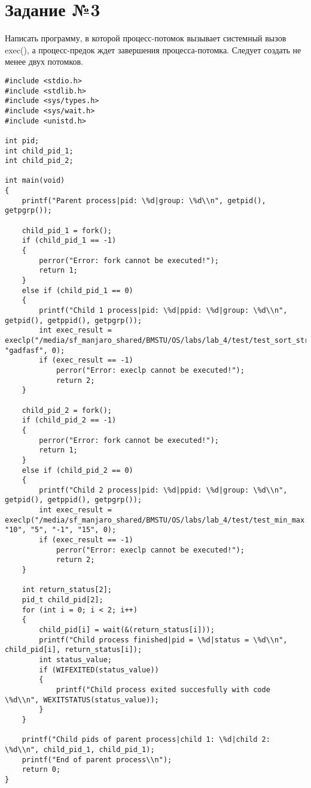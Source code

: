 \section{Задание №3}
Написать программу, в которой процесс-потомок вызывает системный вызов exec(), а процесс-предок ждет завершения процесса-потомка. Следует создать не менее двух потомков.

\begin{lstlisting}[label=task_3,caption=Код к заданию №3]
#include <stdio.h>
#include <stdlib.h>
#include <sys/types.h>
#include <sys/wait.h>
#include <unistd.h>

int pid;
int child_pid_1;
int child_pid_2;

int main(void)
{
    printf("Parent process|pid: \%d|group: \%d\\n", getpid(), getpgrp());

    child_pid_1 = fork();
    if (child_pid_1 == -1)
    {
        perror("Error: fork cannot be executed!");
        return 1;
    }
    else if (child_pid_1 == 0)
    {
        printf("Child 1 process|pid: \%d|ppid: \%d|group: \%d\\n", getpid(), getppid(), getpgrp());
        int exec_result = execlp("/media/sf_manjaro_shared/BMSTU/OS/labs/lab_4/test/test_sort_str.exe", "gadfasf", 0);
        if (exec_result == -1)
            perror("Error: execlp cannot be executed!");
            return 2;
    }

    child_pid_2 = fork();
    if (child_pid_2 == -1)
    {
        perror("Error: fork cannot be executed!");
        return 1;
    }
    else if (child_pid_2 == 0)
    {
        printf("Child 2 process|pid: \%d|ppid: \%d|group: \%d\\n", getpid(), getppid(), getpgrp());
        int exec_result = execlp("/media/sf_manjaro_shared/BMSTU/OS/labs/lab_4/test/test_min_max.exe", "10", "5", "-1", "15", 0);
        if (exec_result == -1)
            perror("Error: execlp cannot be executed!");
            return 2;
    }

    int return_status[2];
    pid_t child_pid[2];
    for (int i = 0; i < 2; i++)
    {
        child_pid[i] = wait(&(return_status[i]));
        printf("Child process finished|pid = \%d|status = \%d\\n", child_pid[i], return_status[i]);
        int status_value;
        if (WIFEXITED(status_value))
        {
            printf("Child process exited succesfully with code \%d\\n", WEXITSTATUS(status_value));
        }
    }

    printf("Child pids of parent process|child 1: \%d|child 2: \%d\\n", child_pid_1, child_pid_1);
    printf("End of parent process\\n");
    return 0;
}
\end{lstlisting}

